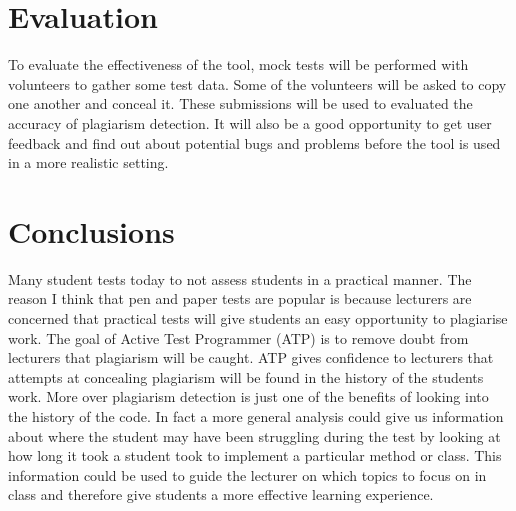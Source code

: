 \documentclass[twocolumn]{article}
\begin{document}
\section{Evaluation}
To evaluate the effectiveness of the tool, mock tests will be performed with
volunteers to gather some test data. Some of the volunteers will be asked to
copy one another and conceal it. These submissions will be used to evaluated the
accuracy of plagiarism detection. It will also be a good opportunity to get user
feedback and find out about potential bugs and problems before the tool is used
in a more realistic setting.

\section{Conclusions}
Many student tests today to not assess students in a practical manner. The
reason I think that pen and paper tests are popular is because lecturers are
concerned that practical tests will give students an easy opportunity to
plagiarise work.  The goal of Active Test Programmer (ATP) is to remove doubt
from lecturers that plagiarism will be caught. ATP gives confidence to lecturers
that attempts at concealing plagiarism will be found in the history of the
students work. More over plagiarism detection is just one of the benefits of
looking into the history of the code. In fact a more general analysis could give
us information about where the student may have been struggling during the test
by looking at how long it took a student took to implement a particular method
or class. This information could be used to guide the lecturer on which topics
to focus on in class and therefore give students a more effective learning
experience.



\end{document}
